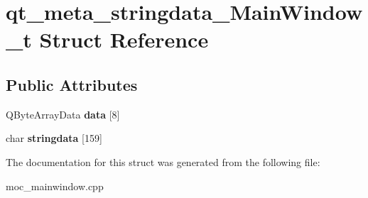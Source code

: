 \hypertarget{structqt__meta__stringdata__MainWindow__t}{\section{qt\-\_\-meta\-\_\-stringdata\-\_\-\-Main\-Window\-\_\-t Struct Reference}
\label{structqt__meta__stringdata__MainWindow__t}
}
\subsection*{Public Attributes}
\begin{DoxyCompactItemize}
\item 
\hypertarget{structqt__meta__stringdata__MainWindow__t_ae8888f3a82b4bd7597ba5dad592aeec6}{Q\-Byte\-Array\-Data {\bfseries data} \mbox{[}8\mbox{]}}\label{structqt__meta__stringdata__MainWindow__t_ae8888f3a82b4bd7597ba5dad592aeec6}

\item 
\hypertarget{structqt__meta__stringdata__MainWindow__t_a5b1f5feb8d03ba15fa546712645c3aa5}{char {\bfseries stringdata} \mbox{[}159\mbox{]}}\label{structqt__meta__stringdata__MainWindow__t_a5b1f5feb8d03ba15fa546712645c3aa5}

\end{DoxyCompactItemize}


The documentation for this struct was generated from the following file\-:\begin{DoxyCompactItemize}
\item 
moc\-\_\-mainwindow.\-cpp\end{DoxyCompactItemize}
